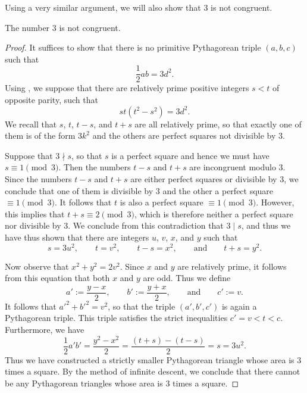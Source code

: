 Using a very similar argument, we will also show that $3$ is not congruent.

\begin{theorem}
  The number $3$ is not congruent.
\end{theorem}

\begin{proof}
  It suffices to show that there is no primitive Pythagorean triple $(a,b,c)$ such that
  \begin{equation*}
    \frac{1}{2}ab=3d^2.
  \end{equation*}
  Using , we suppose that there are relatively prime positive integers $s<t$ of opposite parity, such that
  \begin{equation*}
    st(t^2-s^2)=3d^2.
  \end{equation*}
  We recall that $s$, $t$, $t-s$, and $t+s$ are all relatively prime, so that exactly one of them is of the form $3k^2$ and the others are perfect squares not divisible by $3$.

  Suppose that $3\nmid s$, so that $s$ is a perfect square and hence we must have $s\equiv 1\pmod{3}$. Then the numbers $t-s$ and $t+s$ are incongruent modulo $3$. Since the numbers $t-s$ and $t+s$ are either perfect squares or divisible by $3$, we conclude that one of them is divisible by $3$ and the other a perfect square $\equiv 1\pmod{3}$. It follows that $t$ is also a perfect square $\equiv 1\pmod{3}$. However, this implies that $t+s\equiv 2\pmod{3}$, which is therefore neither a perfect square nor divisible by $3$. We conclude from this contradiction that $3\mid s$, and thus we have thus shown that there are integers $u$, $v$, $x$, and $y$ such that
  \begin{equation*}
    s=3u^2,\qquad t=v^2,\qquad t-s=x^2,\qquad\text{and}\qquad t+s=y^2.
  \end{equation*}
  
  Now observe that $x^2+y^2=2v^2$. Since $x$ and $y$ are relatively prime, it follows from this equation that both $x$ and $y$ are odd. Thus we define
  \begin{equation*}
    a':=\frac{y-x}{2},\qquad b':= \frac{y+x}{2}, \qquad\text{and}\qquad c':=v.
  \end{equation*}
  It follows that $a'^2+b'^2=v^2$, so that the triple $(a',b',c')$ is again a Pythagorean triple. This triple satisfies the strict inequalities $c'=v<t<c$. Furthermore, we have
  \begin{equation*}
    \frac{1}{2}a'b'=\frac{y^2-x^2}{2}=\frac{(t+s)-(t-s)}{2}=s=3u^2.
  \end{equation*}
  Thus we have constructed a strictly smaller Pythagorean triangle whose area is $3$ times a square. By the method of infinite descent, we conclude that there cannot be any Pythagorean triangles whose area is $3$ times a square.
\end{proof}

